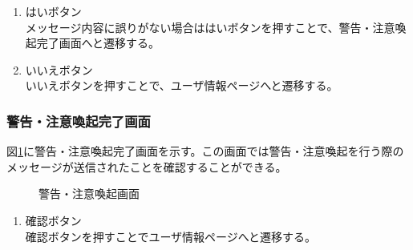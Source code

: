 \documentclass[a4j]{jarticle}
\begin{document}
\begin{enumerate}
  \renewcommand{\labelenumi}{\textcircled{\scriptsize \theenumi}}

\item はいボタン\\
メッセージ内容に誤りがない場合ははいボタンを押すことで、警告・注意喚起完了画面へと遷移する。
\item いいえボタン\\
いいえボタンを押すことで、ユーザ情報ページへと遷移する。

\end{enumerate}

\subsubsection{警告・注意喚起完了画面}
図\ref{fig:warning_ok}に警告・注意喚起完了画面を示す。この画面では警告・注意喚起を行う際のメッセージが送信されたことを確認することができる。
\begin{figure}[H]
\centering
{}
\caption{警告・注意喚起画面}
\label{fig:warning_ok}
\end{figure}

\begin{enumerate}
  \renewcommand{\labelenumi}{\textcircled{\scriptsize \theenumi}}

\item 確認ボタン\\
確認ボタンを押すことでユーザ情報ページへと遷移する。

\end{enumerate}
\end{document}
